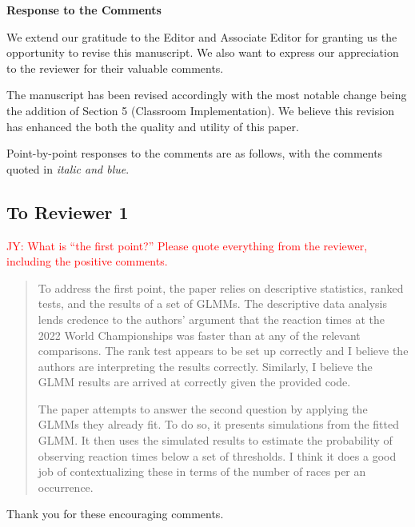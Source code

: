 \documentclass[12pt]{article}
\newcommand{\jy}[1]{\textcolor{red}{JY: #1}}
\newenvironment{comment}%
{\begin{quotation}\noindent\small\it\color{darkblue}\ignorespaces%
}{\end{quotation}}
\begin{document}
\begin{center}
  {\Large\bf Response to the Comments}
\end{center}

We extend our gratitude to the Editor and Associate Editor for 
granting us the opportunity to revise this manuscript. We also want to
express our appreciation to the reviewer for their valuable comments. 


The manuscript has been revised accordingly with the most notable change being 
the addition of Section 5 (Classroom Implementation). We believe this revision 
has enhanced the both the quality and utility of this paper.


Point-by-point responses to the comments are as follows, with the
comments quoted in \emph{\color{darkblue} italic and blue}.


\subsection*{To Reviewer 1}


\jy{What is ``the first point?''  Please quote everything from the
  reviewer, including the positive comments.}

\begin{comment}
To address the first point, the paper relies on descriptive statistics, ranked
tests, and the results of a set of GLMMs. The descriptive data analysis lends
credence to the authors' argument that the reaction times at the 2022 World
Championships was faster than at any of the relevant comparisons. The rank test
appears to be set up correctly and I believe the authors are interpreting the
results correctly. Similarly, I believe the GLMM results are arrived at
correctly given the provided code.

The paper attempts to answer the second question by applying the GLMMs they
already fit. To do so, it presents simulations from the fitted GLMM. It then
uses the simulated results to estimate the probability of observing reaction
times below a set of thresholds. I think it does a good job of contextualizing
these in terms of the number of races per an occurrence.
\end{comment}


Thank you for these encouraging comments.  
\end{document}
